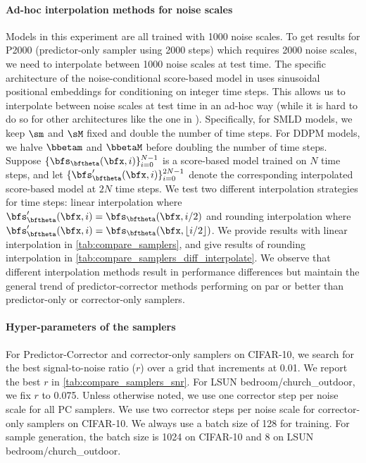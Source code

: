 \paragraph{Ad-hoc interpolation methods for noise scales} 
Models in this experiment are all trained with 1000 noise scales. To get results for P2000 (predictor-only sampler using 2000 steps) which requires 2000 noise scales, we need to interpolate between 1000 noise scales at test time. The specific architecture of the noise-conditional score-based model in \citet{ho2020denoising} uses sinusoidal positional embeddings for conditioning on integer time steps. This allows us to interpolate between noise scales at test time in an ad-hoc way (while it is hard to do so for other architectures like the one in \citet{song2019generative}). Specifically, for SMLD models, we keep $\sm$ and $\sM$ fixed and double the number of time steps. For DDPM models, we halve $\bbetam$ and $\bbetaM$ before doubling the number of time steps. Suppose $\{\bfs_\bftheta(\bfx, i)\}_{i=0}^{N-1}$ is a score-based model trained on $N$ time steps, and let $\{\bfs_\bftheta'(\bfx, i)\}_{i=0}^{2N-1}$ denote the corresponding interpolated score-based model at $2N$ time steps. We test two different interpolation strategies for time steps: linear interpolation where $\bfs_\bftheta'(\bfx, i) = \bfs_\bftheta(\bfx, i / 2)$ and rounding interpolation where $\bfs_\bftheta'(\bfx, i) = \bfs_\bftheta(\bfx, \lfloor i/2 \rfloor)$. We provide results with linear interpolation in \cref{tab:compare_samplers}, and give results of rounding interpolation in \cref{tab:compare_samplers_diff_interpolate}. We observe that different interpolation methods result in performance differences but maintain the general trend of predictor-corrector methods performing on par or better than predictor-only or corrector-only samplers.

\paragraph{Hyper-parameters of the samplers}
For Predictor-Corrector and corrector-only samplers on CIFAR-10, we search for the best signal-to-noise ratio ($r$) over a grid that increments at 0.01. We report the best $r$ in \cref{tab:compare_samplers_snr}. For LSUN bedroom/church\_outdoor, we fix $r$ to 0.075. Unless otherwise noted, we use one corrector step per noise scale for all PC samplers. We use two corrector steps per noise scale for corrector-only samplers on CIFAR-10. We always use a batch size of 128 for training. For sample generation, the batch size is 1024 on CIFAR-10 and 8 on LSUN bedroom/church\_outdoor. 


